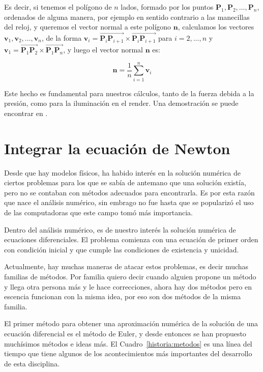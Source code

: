 Es decir, si tenemos el polígono de $n$ lados, formado por los puntos $\textbf{P}_1, \textbf{P}_2, \ldots, \textbf{P}_n$, ordenados de alguna manera, por ejemplo en sentido contrario a las manecillas del reloj, y queremos el vector normal a este polígono $\textbf{n}$, calculamos los vectores $ \textbf{v}_1, \textbf{v}_2, \ldots , \textbf{v}_n $, de la forma $\textbf{v}_i = \overrightarrow{\textbf{P}_i \textbf{P}_{i + 1}} \times \overrightarrow{\textbf{P}_i \textbf{P}_{i + 1}} $ para $i = 2, \ldots, n$ y $\textbf{v}_1 = \overrightarrow{\textbf{P}_1 \textbf{P}_2} \times \overrightarrow{\textbf{P}_1 \textbf{P}_n}$, y luego el vector normal $\textbf{n}$ es:

\begin{equation}
\label{formulaVecNormal} 
\textbf{n} = \frac{1}{n} \sum_{i=1}^{n} \textbf{v}_i
\end{equation}

Este hecho es fundamental para nuestros cálculos, tanto de la fuerza debida a la presión, como para la iluminación en el render.
Una demostración se puede encontrar en \cite{GeometriaParaCAD}.

\section{Integrar la ecuación de Newton}
Desde que hay modelos físicos, ha habido interés en la solución numérica de ciertos problemas para los que se sabía de antemano que una solución existía, pero no se contaban con métodos adecuados para encontrarla.
Es por esta razón que nace el análisis numérico, sin embrago no fue hasta que se popularizó el uso de las computadoras que este campo tomó más importancia.

Dentro del análisis numérico, es de nuestro interés la solución numérica de ecuaciones diferenciales.
El problema comienza con una ecuación de primer orden con condición inicial y que cumple las condiciones de existencia y unicidad.

Actualmente, hay muchas maneras de atacar estos problemas, es decir muchas familias de métodos.
Por familia quiero decir cuando alguien propone un método y llega otra persona más y le hace correcciones, ahora hay dos métodos pero en escencia funcionan con la misma idea, por eso son dos métodos de la misma familia.

El primer método para obtener una aproximación numérica de la solución de una ecuación diferencial es el método de Euler, y desde entonces se han propuesto muchísimos métodos e ideas más.
El Cuadro~\ref{historia:metodos} es una línea del tiempo que tiene algunos de los acontecimientos más importantes del desarrollo de esta disciplina.

